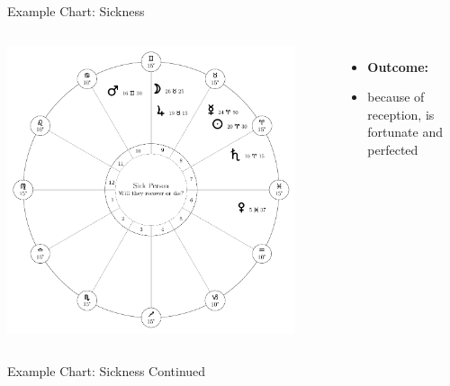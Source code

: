 \begin{frame}[t]{Example Chart: Sickness }
\begin{columns}[T, onlytextwidth]
{\includegraphics[width=0.9\textwidth]{charts/21-chart-sickness}}

\begin{itemize}
\item[] \textbf{Outcome:} \\
\item[] \hspace{2em} because of reception, is fortunate and perfected
\end{itemize}
\end{columns}
\end{frame}
\begin{frame}[t]{Example Chart: Sickness Continued}

\end{frame}